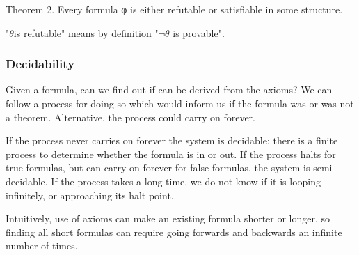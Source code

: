 Theorem 2. Every formula φ is either refutable or satisfiable in some structure.

"\(\theta \)is refutable" means by definition "\(¬\theta \) is provable".

\subsubsection{Decidability}

Given a formula, can we find out if can be derived from the axioms? We can follow a process for doing so which would inform us if the formula was or was not a theorem. Alternative, the process could carry on forever.

If the process never carries on forever the system is decidable: there is a finite process to determine whether the formula is in or out. If the process halts for true formulas, but can carry on forever for false formulas, the system is semi-decidable. If the process takes a long time, we do not know if it is looping infinitely, or approaching its halt point.

Intuitively, use of axioms can make an existing formula shorter or longer, so finding all short formulas can require going forwards and backwards an infinite number of times.

